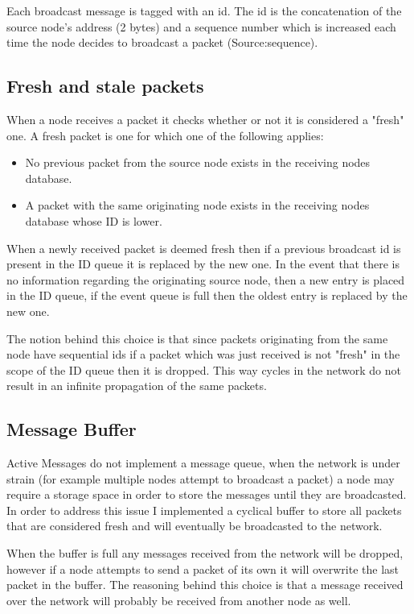 \documentclass[a4paper]{article}
\begin{document}
Each broadcast message is tagged with an id. The id is the concatenation of the source node's address 
(2 bytes) and a sequence number which is increased each time the node decides to broadcast a packet (Source:sequence).


\subsection*{Fresh and stale packets }
When a node receives a packet it checks whether or not it is considered a "fresh" one. A fresh packet is one for which
one of the following applies:

\begin{itemize}
\item No previous packet from the source node exists in the receiving nodes database.
\item A packet with the same originating node exists in the receiving nodes database whose ID is lower.
\end{itemize}

When a newly received packet is deemed fresh then if a previous broadcast id is present in the ID queue
it is replaced by the new one. In the event that there is no information regarding the originating source node,
then a new entry is placed in the ID queue, if the event queue is full then the oldest entry is replaced
by the new one.

The notion behind this choice is that since packets originating from the same node have sequential ids
if a packet which was just received is not "fresh" in the scope of the ID queue then it is dropped. This
way cycles in the network do not result in an infinite propagation of the same packets.

\subsection*{Message Buffer}

Active Messages do not implement a message queue, when the network is under strain (for example multiple
nodes attempt to broadcast a packet) a node may require a storage space in order to store the messages
until they are broadcasted. In order to address this issue I implemented a cyclical buffer to store
all packets that are considered fresh and will eventually be broadcasted to the network.

When the buffer is full any messages received from the network will be dropped, however if a node attempts
to send a packet of its own it will overwrite the last packet in the buffer. The reasoning behind this choice
is that a message received over the network will probably be received from another node as well.
\end{document}
